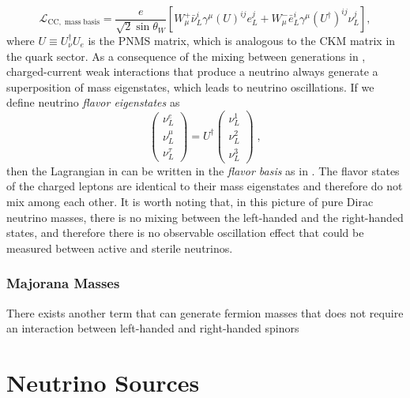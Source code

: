 \begin{equation}
    \mathcal{L}_\mathrm{CC,\;mass\;basis} = \frac{e}{\sqrt{2}\sin \theta_W}
    \left[
        W^+_\mu \bar{\nu}_L^i \gamma^\mu (U)^{ij} e_L^j
        + W^-_\mu \bar{e}_L^i \gamma^\mu (U^\dag)^{ij} \nu_L^j
    \right],\label{eq:lag-cc-mass-basis}
\end{equation}
where $U\equiv U_\nu^\dag U_e$ is the PNMS matrix, which is analogous to the CKM matrix in the quark sector. As a consequence of the mixing between generations in , charged-current weak interactions that produce a neutrino always generate a superposition of mass eigenstates, which leads to neutrino oscillations. If we define neutrino \emph{flavor eigenstates} as
\begin{equation}
    \begin{pmatrix}
        \nu_{L}^e \\
        \nu_{L}^\mu \\
        \nu_{L}^\tau
    \end{pmatrix}
    = U^\dag
    \begin{pmatrix}
        \nu_{L}^1 \\
        \nu_{L}^2 \\
        \nu_{L}^3
    \end{pmatrix}\;,
\end{equation}
then the Lagrangian in  can be written in the \emph{flavor basis} as in . The flavor states of the charged leptons are identical to their mass eigenstates and therefore do not mix among each other. It is worth noting that, in this picture of pure Dirac neutrino masses, there is no mixing between the left-handed and the right-handed states, and therefore there is no observable oscillation effect that could be measured between active and sterile neutrinos. 

\subsubsection{Majorana Masses}

There exists another term that can generate fermion masses that does not require an interaction between left-handed and right-handed spinors


\section{Neutrino Sources}

